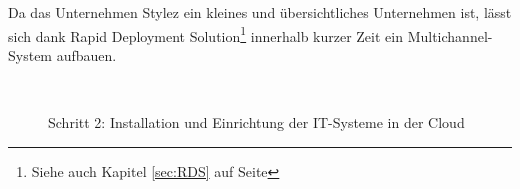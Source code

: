 Da das Unternehmen Stylez ein kleines und übersichtliches Unternehmen ist, lässt sich dank Rapid Deployment Solution\footnote{Siehe auch Kapitel \ref{sec:RDS} auf Seite \pageref{sec:RDS}} innerhalb kurzer Zeit ein Multichannel-System aufbauen.
\begin{figure}[H]
\centering
\begin{minipage}[t]{0.9\textwidth}
{\centering{}\\}
\caption{Schritt 2: Installation und Einrichtung der IT-Systeme in der Cloud} %
\end{minipage}
\end{figure}
\newpage

